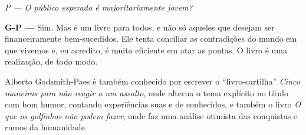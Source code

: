 \emph{P --- O público esperado é majoritariamente jovem?}

\textbf{G-P ---} Sim. Mas é um livro para todos, e não só aqueles que desejam ser financeiramente bem-sucedidos. Ele tenta conciliar as contradições do mundo em que vivemos e, eu acredito, é muito eficiente em atar as pontas. O livro é uma realização, de todo modo.

Alberto Godsmith-Paes é também conhecido por escrever o ``livro-cartilha'' \emph{Cinco maneiras para não reagir a um assalto}, onde alterna o tema explícito no título com bom humor, contando experiências suas e de conhecidos, e também o livro \emph{O que os golfinhos não podem fazer}, onde faz uma análise otimista das conquistas e rumos da humanidade.

